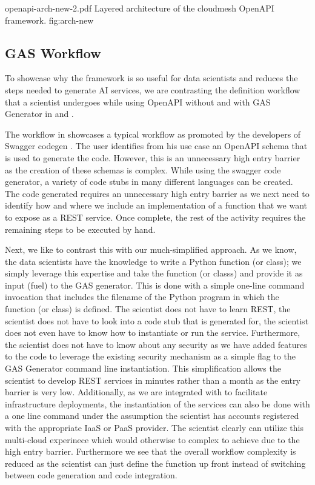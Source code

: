 
\OneFIGURE
    {openapi-arch-new-2.pdf}
    {Layered architecture of the cloudmesh OpenAPI framework.}
    {fig:arch-new}

\subsection{GAS Workflow}

To showcase why the framework is so useful for data scientists and reduces
the steps needed to generate AI services, we are
contrasting the definition workflow that a scientist undergoes while
using OpenAPI without and with GAS Generator
in  and .

The workflow in  showcases a typical workflow
as promoted by the developers of Swagger
codegen \cite{www-swagger-codegen}. The user identifies from his use
case an OpenAPI schema that is used to generate the code. However,
this is an unnecessary high entry barrier as the creation of these
schemas is complex. While using the swagger code generator, a variety
of code stubs in many different languages can be created. The code
generated requires an unnecessary high entry barrier as we next need
to identify how and where we include an implementation of a function
that we want to expose as a REST service. Once complete, the rest of
the activity requires the remaining steps to be executed by hand.

Next, we like to contrast this with our much-simplified approach. As
we know, the data scientists have the knowledge to write a Python
function (or class); we simply leverage this expertise and take the
function (or classs) and provide it as input (fuel) to the GAS
generator. This is done with a simple one-line command invocation that
includes the filename of the Python program in which the function (or
class) is defined. The scientist does not have to learn REST, the
scientist does not have to look into a code stub that is generated for,
the scientist does not even have to know how to instantiate or run
the service. Furthermore, the scientist does not have to know about
any security as we have added features to the code to leverage the
existing security mechanism as a simple flag to the GAS Generator
command line instantiation. This simplification allows the scientist
to develop REST services in minutes rather than a month as the entry
barrier is very low. Additionally, as we are integrated with \Cloudmesh
to facilitate
infrastructure deployments, the instantiation of the services can also
be done with a one line command under the assumption the scientist has
accounts registered with the appropriate IaaS or PaaS provider. The scientist
clearly can utilize this multi-cloud experinece which would otherwise
to complex to achieve due to the high entry barrier. Furthermore we see that
the overall workflow complexity is reduced as the scientist can just define the
function up front instead of switching between code generation and code
integration.

